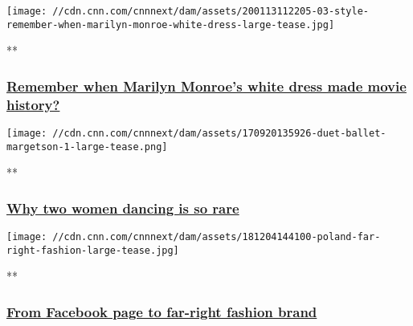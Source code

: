 \href{/videos/fashion/2020/01/15/marilyn-monroe-white-dress-remember-when-lon-orig.cnn/video/playlists/cnn-style/}{}

\texttt{[image: //cdn.cnn.com/cnnnext/dam/assets/200113112205-03-style-remember-when-marilyn-monroe-white-dress-large-tease.jpg]}

**

\hypertarget{remember-when-marilyn-monroes-white-dress-made-movie-history}{%
\subsubsection{\texorpdfstring{\href{/videos/fashion/2020/01/15/marilyn-monroe-white-dress-remember-when-lon-orig.cnn/video/playlists/cnn-style/}{Remember
when Marilyn Monroe's white dress made movie
history?}}{Remember when Marilyn Monroe's white dress made movie history?}}\label{remember-when-marilyn-monroes-white-dress-made-movie-history}}

\href{/videos/arts/2017/09/20/royal-ballet-london-yasmine-naghdi-beatriz-stix-brunell-duet-style-orig.cnn/video/playlists/cnn-style/}{}

\texttt{[image: //cdn.cnn.com/cnnnext/dam/assets/170920135926-duet-ballet-margetson-1-large-tease.png]}

**

\hypertarget{why-two-women-dancing-is-so-rare}{%
\subsubsection{\texorpdfstring{\href{/videos/arts/2017/09/20/royal-ballet-london-yasmine-naghdi-beatriz-stix-brunell-duet-style-orig.cnn/video/playlists/cnn-style/}{Why
two women dancing is so
rare}}{Why two women dancing is so rare}}\label{why-two-women-dancing-is-so-rare}}

\href{/videos/fashion/2018/12/04/far-right-fashion-poland-populism-red-is-bad-lon-ejk-style-orig.cnn/video/playlists/cnn-style/}{}

\texttt{[image: //cdn.cnn.com/cnnnext/dam/assets/181204144100-poland-far-right-fashion-large-tease.jpg]}

**

\hypertarget{from-facebook-page-to-far-right-fashion-brand}{%
\subsubsection{\texorpdfstring{\href{/videos/fashion/2018/12/04/far-right-fashion-poland-populism-red-is-bad-lon-ejk-style-orig.cnn/video/playlists/cnn-style/}{From
Facebook page to far-right fashion
brand}}{From Facebook page to far-right fashion brand}}\label{from-facebook-page-to-far-right-fashion-brand}}

